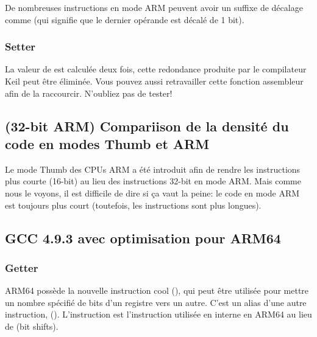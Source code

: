 De nombreuses instructions en mode ARM peuvent avoir un suffixe de décalage comme
 (qui signifie que le dernier opérande est décalé de 1 bit).



\subsubsection{Setter}



La valeur de  est calculée deux fois, cette redondance produite par le
compilateur Keil peut être éliminée.
Vous pouvez aussi retravailler cette fonction assembleur afin de la raccourcir. N'oubliez
pas de tester!

\subsection{(32-bit ARM) Compariison de la densité du code en modes Thumb et ARM}

Le mode Thumb des CPUs ARM a été introduit afin de rendre les instructions plus courte
(16-bit) au lieu des instructions 32-bit en mode ARM.
Mais comme nous le voyons, il est difficile de dire si ça vaut la peine: le code en
mode ARM est toujours plus court (toutefois, les instructions sont plus longues).

\subsection{GCC 4.9.3 avec optimisation pour ARM64}

\subsubsection{Getter}



ARM64 possède la nouvelle instruction cool  (), qui peut être utilisée pour mettre un nombre
spécifié de bits d'un registre vers un autre.
C'est un alias d'une autre instruction,  ().
L'instruction  est l'instruction utilisée en interne en ARM64 au lieu de
 (bit shifts).

